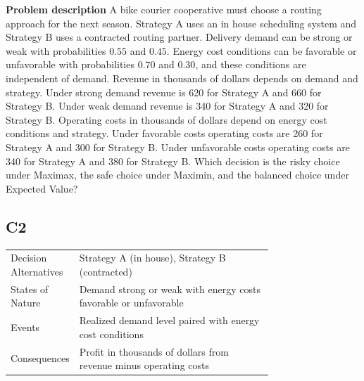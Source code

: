 \begin{ExamProblems}
		\item
		\textbf{Problem description}
		A bike courier cooperative must choose a routing approach for the next season. Strategy A uses an in house scheduling system and Strategy B uses a contracted routing partner. Delivery demand can be strong or weak with probabilities $0.55$ and $0.45$. Energy cost conditions can be favorable or unfavorable with probabilities $0.70$ and $0.30$, and these conditions are independent of demand. Revenue in thousands of dollars depends on demand and strategy. Under strong demand revenue is 620 for Strategy A and 660 for Strategy B. Under weak demand revenue is 340 for Strategy A and 320 for Strategy B. Operating costs in thousands of dollars depend on energy cost conditions and strategy. Under favorable costs operating costs are 260 for Strategy A and 300 for Strategy B. Under unfavorable costs operating costs are 340 for Strategy A and 380 for Strategy B. Which decision is the risky choice under Maximax, the safe choice under Maximin, and the balanced choice under Expected Value?

		\subsection*{C2}
		\begin{center}
			\begin{tabular}{l p{0.74\linewidth}}
				\toprule
				Decision Alternatives & Strategy A (in house), Strategy B (contracted) \\
				States of Nature & Demand strong or weak with energy costs favorable or unfavorable \\
				Events & Realized demand level paired with energy cost conditions \\
				Consequences & Profit in thousands of dollars from revenue minus operating costs \\
				\bottomrule
			\end{tabular}
		\end{center}


\end{ExamProblems}

